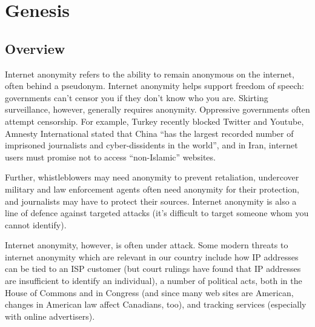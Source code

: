 \documentclass[12pt,a4paper]{article}
\begin{document}
\pagestyle{fancy}
\fancyhf{} %
\renewcommand{\headrulewidth}{0pt} %

\section{Genesis}
\subsection{Overview}
Internet anonymity refers to the ability to remain anonymous on the internet, often behind a pseudonym. Internet anonymity helps support freedom of speech: governments can't censor you if they don't know who you are. Skirting surveillance, however, generally requires anonymity. Oppressive governments often attempt censorship. For example, Turkey recently blocked Twitter and Youtube, Amnesty International stated that China ``has the largest recorded number of imprisoned journalists and cyber-dissidents in the world'', and in Iran, internet users must promise not to access ``non-Islamic'' websites.

Further, whistleblowers may need anonymity to prevent retaliation, undercover military and law enforcement agents often need anonymity for their protection, and journalists may have to protect their sources. Internet anonymity is also a line of defence against targeted attacks (it's difficult to target someone whom you cannot identify).

Internet anonymity, however, is often under attack. Some modern threats to internet anonymity which are relevant in our country include how IP addresses can be tied to an ISP customer (but court rulings have found that IP addresses are insufficient to identify an individual), a number of political acts, both in the House of Commons and in Congress (and since many web sites are American, changes in American law affect Canadians, too), and tracking services (especially with online advertisers).
\end{document}
